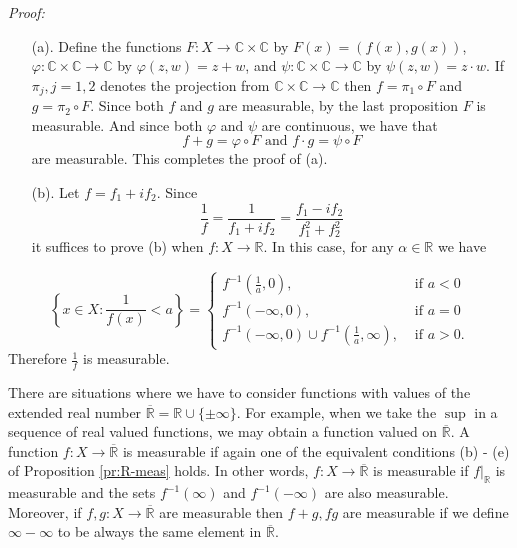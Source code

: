 \documentclass[12pt]{report}
\begin{document}
\medskip
\noindent
{\em Proof:}
\begin{itemize}
\item[(a).]  Define the functions $F: X \longrightarrow \mathbb{C}
\times \mathbb{C}$ by $F(x) = (f(x), g(x))$,
$\varphi: \mathbb{C} \times \mathbb{C}\to \mathbb{C}$ by 
$\varphi(z, w) = z + w$, and $\psi: \mathbb{C} \times \mathbb{C}
\longrightarrow
\mathbb{C}$ by $\psi (z, w) = z \cdot w$.  If $\pi_j, j = 1, 2$ 
denotes the  projection from $\mathbb{C}
\times \mathbb{C} \longrightarrow \mathbb{C}$ then $f = \pi_1 \circ F$
and $g =
\pi_2 \circ F$.  Since both $f$ and $g$ are measurable, by the last
proposition $F$ is measurable.  And since both $\varphi $ and $\psi$ are
continuous, we have that
\[ f + g = \varphi \circ F \mbox{ and } f \cdot g = \psi \circ F
\] are measurable.  This completes the proof of (a).
\item[(b).]  Let $f = f_1 + if_2$.  Since
\[
\frac{1}{f} = \frac{1}{f_1 + if_2} = \frac{f_1 - if_2}{f^2_1 + f^2_2}
\]
 it suffices to prove (b) when $f: X \longrightarrow
\mathbb{R}$.  In this case, for any
$\alpha \in \mathbb{R}$ we have
\end{itemize}


\[
\left \{x \in X: \frac{1}{f(x)} < a \right \} = \left \{ 
\begin{array}{ll} f^{-1} \left (\frac{1}{a},  0 \right ),\qquad 
&\mbox{ if } a < 0\\ f^{-1} \left ( - \infty, 0 \right ),  \quad &\mbox{ if } a =
0 \\ f^{-1} (- \infty, 0) \cup f^{-1} \left ( \frac{1}{a}, \infty \right ), 
&\mbox{ if } a > 0.
\end{array} \right .
\]
 Therefore $\frac{1}{f}$ is measurable. 

\medskip
\noindent
 There are situations where we have to consider
functions with values of the extended real number
$\overline{\mathbb{R}} =
\mathbb{R} \cup \{\pm \infty \}.$  For example, when we take the $\sup$
in a sequence of real valued functions, we may obtain a function valued
on $\overline{\mathbb{R}}$.  A function $ f: X
\longrightarrow
\overline{\mathbb{R}}$ is measurable if again one of the equivalent
conditions (b) - (e) of  Proposition \ref{pr:R-meas} holds.  In other words,
$f: X
\longrightarrow
\overline{\mathbb{R}}$ is measurable if $f|_{\mathbb{R}}$ is
measurable and the sets $f^{-1} (\infty)$ and
$f^{-1} (- \infty)$ are also measurable.  Moreover, if $f, g: X \to
\overline{\mathbb{R}}$ are measurable then $f+g, fg$ are measurable if
we define
$\infty - \infty$ to be always the same element in
$\overline{\mathbb{R}}$.
\end{document}
